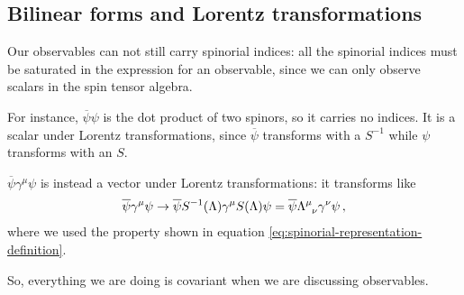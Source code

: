 \documentclass[main.tex]{subfiles}
\begin{document}
\subsection{Bilinear forms and Lorentz transformations}

Our observables can not still carry spinorial indices: all the spinorial indices must be saturated in the expression for an observable, since we can only observe scalars in the spin tensor algebra. 

For instance, \(\overline{\psi} \psi \) is the dot product of two spinors, so it carries no indices.
It is a scalar under Lorentz transformations, since \(\overline{\psi}\) transforms with a \(S^{-1}\) while \(\psi \) transforms with an \(S\).  

\(\overline{\psi} \gamma^{\mu } \psi \) is instead a vector under Lorentz transformations: it transforms like 
%
\begin{align}
\overline{\psi} \gamma^{\mu } \psi \rightarrow
\overline{\psi} S^{-1}(\Lambda ) \gamma^{\mu } S(\Lambda  ) \psi 
= \overline{\psi} \tensor{\Lambda }{^{\mu }_{\nu }} \gamma^{\nu } \psi 
\,,
\end{align}
%
where we used the property shown in equation \eqref{eq:spinorial-representation-definition}.

So, everything we are doing is covariant when we are discussing observables. 
\end{document}
